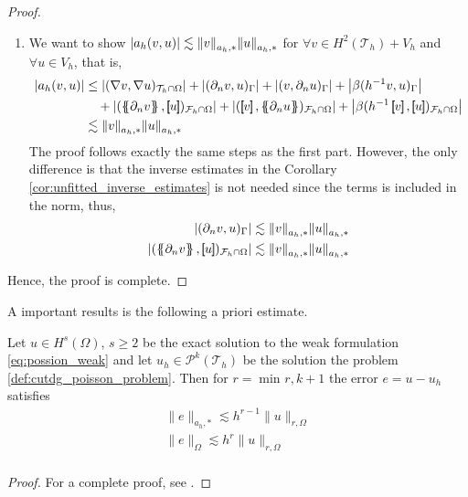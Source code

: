 \begin{proof}
\begin{enumerate}[label=\arabic*)]
\item We want to show $\left\lvert  a_{h}( v,u)  \right\rvert  \lesssim \| v \|_{ a_{h},* }^{  }  \| u \|_{ a_{h},* }^{  }$
for $ \forall v \in  H^{2}( \mathcal{T}_{h} ) + V_{h} $ and $ \forall u \in V_{h}$,
    that is,      \[
        \begin{split}
    \left\lvert a_{h}( v,u)  \right\rvert & \le  \left\lvert( \nabla v, \nabla u)_{\mathcal{T} _{h} \cap \Omega }  \right\rvert +  \left\lvert  ( \partial _{n} v,u)_{\Gamma } \right\rvert   + \left\lvert ( v, \partial _{n} u)_{\Gamma } \right\rvert  +
    \left\lvert\beta ( h^{-1} v,u)_{\Gamma }  \right\rvert  \\
    & \quad  + \left\lvert( \mean{ \partial _{n} v }  , \jump{ u }  ) _{\mathcal{F} _{h} \cap \Omega }  \right\rvert  + \left\lvert ( \jump{ v }  , \mean{ \partial _{n} u }  )_{\mathcal{F} _{h}\cap \Omega } \right\rvert  + \left\lvert \beta ( h^{-1} \jump{ v }  ,
    \jump{ u }  )_{\mathcal{F}_{h}\cap \Omega  } \right\rvert \\
     & \lesssim  \| v \|_{ a_{h},* }^{  }  \| u \|_{ a_{h},* }^{  }
        \end{split}
    \]
    The proof follows exactly the same steps as the first part. However, the only difference is that the inverse estimates in the Corollary \ref{cor:unfitted_inverse_estimates} is not needed since the terms is included in the norm, thus, \[
        \begin{split}
    \abs{ ( \partial _{n} v, u) _{\Gamma } } & \lesssim \| v \|_{ a_{h},* }^{  } \| u \|_{a_{h},*  }^{  } \\
    \abs{ ( \mean{ \partial _{n} v  }  , \jump{ u }  ) _{\mathcal{F} _{h} \cap \Omega  } } & \lesssim \| v \|_{ a_{h},* }^{  } \| u \|_{a_{h},*  }^{  }
        \end{split}
    \]

    \end{enumerate}

    Hence, the proof is complete.



\end{proof}


A important results is the following a priori estimate.

\begin{theorem}
    Let $u \in H^{s}( \Omega ) $, $s\ge 2$ be the exact solution to the weak formulation \eqref{eq:possion_weak} and let $u_{h} \in \mathcal{P}^{k}( \mathcal{T} _{h})  $ be the solution the problem \ref{def:cutdg_poisson_problem}. Then for $r =
    \min_{}{r, k+1} $ the error $e = u - u_{h}$ satisfies \[
        \begin{split}
    \| e \|_{ a_{h},* }^{  } \lesssim   h^{r-1} \| u \|_{ r,\Omega  }^{  }\\
    \| e \|_{ \Omega  }^{  } \lesssim   h^{r} \| u \|_{ r,\Omega  }^{  }\\
        \end{split}
    \]
\end{theorem}
\begin{proof}
    For a complete proof, see \cite{gurkan2019stabilized}.
\end{proof}

